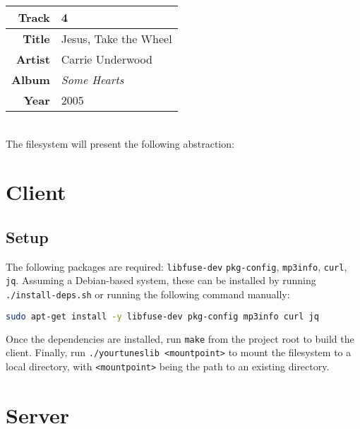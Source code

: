 \documentclass{article}
\begin{document}
	\begin{tabular}{| r | l |}
		\hline
		\textbf{Track} & 4 \\ \hline
		\textbf{Title} & Jesus, Take the Wheel \\ \hline
		\textbf{Artist} & Carrie Underwood \\ \hline
		\textbf{Album} & \textit{Some Hearts} \\ \hline 
		\textbf{Year} & 2005 \\ \hline
	\end{tabular} \\
	
	\noindent The filesystem will present the following abstraction: \\ 
	
		
	\section{Client}
	\subsection{Setup}
	The following packages are required: \texttt{libfuse-dev} \texttt{pkg-config}, \texttt{mp3info}, \texttt{curl}, \texttt{jq}. Assuming a Debian-based system, these can be installed by running \\ \texttt{./install-deps.sh} or running the following command manually:
	
\begin{lstlisting}[language=Bash]
sudo apt-get install -y libfuse-dev pkg-config mp3info curl jq 
\end{lstlisting}
	
	\noindent Once the dependencies are installed, run \texttt{make} from the project root to build the client. Finally, run \texttt{./yourtuneslib <mountpoint>} to mount the filesystem to a local directory, with \texttt{<mountpoint>} being the path to an existing directory.
	
	\section{Server}
\end{document}
